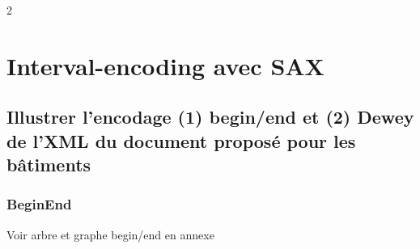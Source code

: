 2\chapter{Interval-encoding avec SAX}
\section{Illustrer l’encodage (1) begin/end et (2) Dewey de l’XML du document proposé pour les bâtiments}
\subsection{BeginEnd}
Voir arbre et graphe begin/end en annexe
